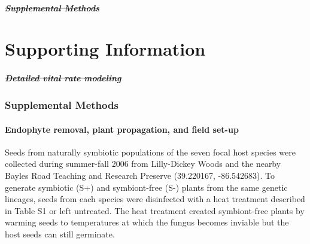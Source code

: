 \documentclass[lineno, sn-basic]{sn-jnl}%
\providecommand{\DIFadd}[1]{{\protect\color{blue}#1}} %
\providecommand{\DIFdel}[1]{{\protect\color{red}\protect\scriptsize\sout{#1}}}
\providecommand{\DIFadd}[1]{{\protect\color{blue}\uwave{#1}}} %
\providecommand{\DIFdel}[1]{{\protect\color{red}\sout{#1}}}                      %
\providecommand{\DIFaddbegin}{} %
\providecommand{\DIFaddend}{} %
\providecommand{\DIFdelbegin}{} %
\providecommand{\DIFdelend}{} %
\newcommand{\DIFscaledelfig}{0.5}
\newlength{\DIFdelgraphicswidth} %
\newlength{\DIFdelgraphicsheight} %
\newcommand{\DIFaddincludegraphics}[2][]{{\color{blue}\fbox{\DIFOincludegraphics[#1]{#2}}}} %
\newcommand{\DIFdelincludegraphics}[2][]{%
\sbox{\DIFdelgraphicsbox}{\DIFOincludegraphics[#1]{#2}}%
\settoboxwidth{\DIFdelgraphicswidth}{\DIFdelgraphicsbox} %
\settoboxtotalheight{\DIFdelgraphicsheight}{\DIFdelgraphicsbox} %
\scalebox{\DIFscaledelfig}{%
\parbox[b]{\DIFdelgraphicswidth}{\usebox{\DIFdelgraphicsbox}\\[-\baselineskip] \rule{\DIFdelgraphicswidth}{0em}}\llap{\resizebox{\DIFdelgraphicswidth}{\DIFdelgraphicsheight}{%
\setlength{\unitlength}{\DIFdelgraphicswidth}%
\begin{picture}(1,1)%
\thicklines\linethickness{2pt} %
{\color[rgb]{1,0,0}\put(0,0){\framebox(1,1){}}}%
{\color[rgb]{1,0,0}\put(0,0){\line( 1,1){1}}}%
{\color[rgb]{1,0,0}\put(0,1){\line(1,-1){1}}}%
\end{picture}%
}\hspace*{3pt}}} %
} %
\DeclareRobustCommand{\DIFaddbegin}{\DIFOaddbegin \let\includegraphics\DIFaddincludegraphics} %
\DeclareRobustCommand{\DIFaddend}{\DIFOaddend \let\includegraphics\DIFOincludegraphics} %
\DeclareRobustCommand{\DIFdelbegin}{\DIFOdelbegin \let\includegraphics\DIFdelincludegraphics} %
\DeclareRobustCommand{\DIFdelend}{\DIFOaddend \let\includegraphics\DIFOincludegraphics} %
\begin{document}
\DIFdelbegin \subsubsection*{\DIFdel{Supplemental Methods}}

\DIFdelend \DIFaddbegin \part{\DIFadd{Supporting Information}}
\DIFaddend 


\DIFdelbegin \subsubsection*{\DIFdel{Detailed vital rate modeling}}

\DIFdelend \DIFaddbegin \parttoc
\renewcommand{\listmyfigurename}{List of Supp. Figures}
\renewcommand{\listtablename}{List of Supp. Tables}
\listofmyfigures
\listoftables
\DIFaddend 


\DIFaddbegin \newpage

\setcounter{myfigure}{0}








\section{\DIFadd{Supplemental Methods}}\label{SupMethods}

\renewcommand\theequation{S\arabic{equation}}   

\subsection{\DIFadd{Endophyte removal, plant propagation, and field set-up}}\label{SupMethods1}
\DIFadd{Seeds from naturally symbiotic populations of the seven focal host species were collected during summer-fall 2006 from Lilly-Dickey Woods and the nearby Bayles Road Teaching and Research Preserve (39.220167, -86.542683). 
To generate symbiotic (S+) and symbiont-free (S-) plants from the same genetic lineages, seeds from each species were disinfected with a heat treatment described in Table S1 or left untreated. 
The heat treatment created symbiont-free plants by warming seeds to temperatures at which the fungus becomes inviable but the host seeds can still germinate.
}
\end{document}
